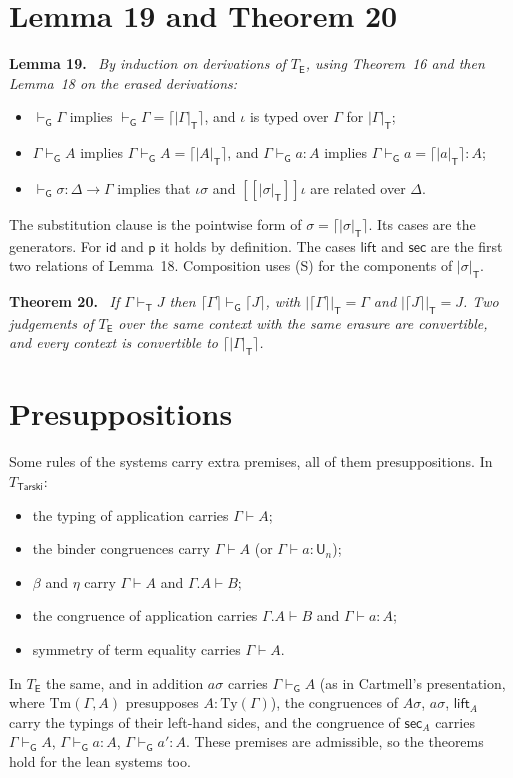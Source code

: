\documentclass[11pt]{article}
\newenvironment{theorem}[1]{\par\medskip\noindent\textbf{Theorem #1.}\ \itshape}{\par\medskip}
\newenvironment{lemma}[1]{\par\medskip\noindent\textbf{Lemma #1.}\ \itshape}{\par\medskip}
\theoremstyle{definition}
\theoremstyle{remark}
\newcommand{\vdashG}{\vdash_{\mathsf G}}
\newcommand{\vdashT}{\vdash_{\mathsf T}}
\newcommand{\U}{\mathsf U}
\newcommand{\p}{\mathsf p}
\newcommand{\id}{\mathsf{id}}
\newcommand{\lift}{\mathsf{lift}}
\newcommand{\sect}{\mathsf{sec}}
\newcommand{\er}[1]{|#1|_{\mathsf T}}
\newcommand{\ev}[2]{[\![#1]\!]#2}
\newcommand{\idv}{\iota}
\begin{document}
\section{Lemma 19 and Theorem 20}\label{sec:thm20}

\begin{lemma}{19}
By induction on derivations of $T_{\mathsf E}$, using Theorem~16 and then
Lemma~18 on the erased derivations:
\begin{itemize}
\item $\vdashG\Gamma$ implies $\vdashG\Gamma=\lceil\er\Gamma\rceil$, and $\idv$ is typed over $\Gamma$ for $\er\Gamma$;
\item $\Gamma\vdashG A$ implies $\Gamma\vdashG A=\lceil\er A\rceil$, and
$\Gamma\vdashG a:A$ implies $\Gamma\vdashG a=\lceil\er a\rceil:A$;
\item $\vdashG\sigma:\Delta\to\Gamma$ implies that $\idv\sigma$ and $\ev{\er\sigma}\idv$ are related over $\Delta$.
\end{itemize}
\end{lemma}
The substitution clause is the pointwise form of $\sigma=\lceil\er\sigma\rceil$.
Its cases are the generators. For $\id$ and $\p$ it holds by definition.
The cases $\lift$ and $\sect$ are the first two relations of Lemma~18.
Composition uses (S) for the components of $\er\sigma$.

\begin{theorem}{20}
If $\Gamma\vdashT J$ then $\lceil\Gamma\rceil\vdashG\lceil J\rceil$, with
$\er{\lceil\Gamma\rceil}=\Gamma$ and $\er{\lceil J\rceil}=J$. Two judgements
of $T_{\mathsf E}$ over the same context with the same erasure are convertible,
and every context is convertible to $\lceil\er\Gamma\rceil$.
\end{theorem}

\section{Presuppositions}\label{sec:presup}

Some rules of the systems carry extra premises, all of them
presuppositions. In $T_{\mathsf{Tarski}}$:
\begin{itemize}
\item the typing of application carries $\Gamma\vdash A$;
\item the binder congruences carry $\Gamma\vdash A$ (or $\Gamma\vdash a:\U_n$);
\item $\beta$ and $\eta$ carry $\Gamma\vdash A$ and $\Gamma.A\vdash B$;
\item the congruence of application carries $\Gamma.A\vdash B$ and $\Gamma\vdash a:A$;
\item symmetry of term equality carries $\Gamma\vdash A$.
\end{itemize}
In $T_{\mathsf E}$ the same, and in addition $a\sigma$ carries $\Gamma\vdashG A$
(as in Cartmell's presentation, where $\mathrm{Tm}(\Gamma,A)$ presupposes
$A:\mathrm{Ty}(\Gamma)$), the congruences of $A\sigma$, $a\sigma$, $\lift_A$
carry the typings of their left-hand sides, and the congruence of $\sect_A$ carries
$\Gamma\vdashG A$, $\Gamma\vdashG a:A$, $\Gamma\vdashG a':A$.
These premises are admissible, so the theorems hold for the lean systems too.
\end{document}
